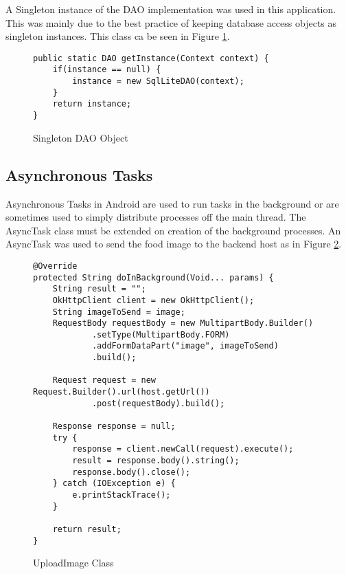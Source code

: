 A Singleton instance of the DAO implementation was used in this application.
This was mainly due to the best practice of keeping database access objects as singleton instances.
This class ca be seen in Figure \ref{lst:singletonDao}.

\begin{figure}[h]
\caption{Singleton DAO Object}
\label{lst:singletonDao}
\begin{lstlisting}[style=Java]
public static DAO getInstance(Context context) {
    if(instance == null) {
        instance = new SqlLiteDAO(context);
    }
    return instance;
}
\end{lstlisting}
\end{figure}

\tocless\subsection{Asynchronous Tasks}
Asynchronous Tasks in Android are used to run tasks in the background or are sometimes used to simply distribute processes off the main thread.
The AsyncTask class must be extended on creation of the background processes.
An AsyncTask was used to send the food image to the backend host as in Figure \ref{lst:rrCode}.
\begin{figure}[h]
\caption{UploadImage Class}
\label{lst:rrCode}
\begin{lstlisting}[style=Java]
@Override
protected String doInBackground(Void... params) {
    String result = "";
    OkHttpClient client = new OkHttpClient();
    String imageToSend = image;
    RequestBody requestBody = new MultipartBody.Builder()
            .setType(MultipartBody.FORM)
            .addFormDataPart("image", imageToSend)
            .build();

    Request request = new Request.Builder().url(host.getUrl())
            .post(requestBody).build();

    Response response = null;
    try {
        response = client.newCall(request).execute();
        result = response.body().string();
        response.body().close();
    } catch (IOException e) {
        e.printStackTrace();
    }

    return result;
}
\end{lstlisting}
\end{figure}

